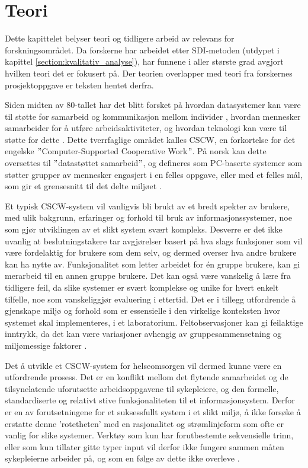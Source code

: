 \chapter{Teori}
\label{chp:teori} 

Dette kapittelet belyser teori og tidligere arbeid av relevans for forskningsområdet. Da forskerne har arbeidet etter SDI-metoden (utdypet i kapittel \ref{section:kvalitativ_analyse}), har funnene i aller største grad avgjort hvilken teori det er fokusert på. Der teorien overlapper med teori fra forskernes prosjektoppgave \citep{Sund13} er teksten hentet derfra. 

\noindent
Siden midten av 80-tallet har det blitt forsket på hvordan datasystemer kan være til støtte for samarbeid og kommunikasjon mellom individer \citep{Rogers94}, hvordan mennesker samarbeider for å utføre arbeidsaktiviteter, og hvordan teknologi kan være til støtte for dette \citep{Ellis91}. Dette tverrfaglige området kalles CSCW, en forkortelse for det engelske $"$Computer-Supported Cooperative Work$"$. På norsk kan dette oversettes til $"$datastøttet samarbeid$"$, og defineres som PC-baserte systemer som støtter grupper av mennesker engasjert i en felles oppgave, eller med et felles mål, som gir et grensesnitt til det delte miljøet \citep{Ellis91}.

\noindent
Et typisk CSCW-system vil vanligvis bli brukt av et bredt spekter av brukere, med ulik bakgrunn, erfaringer og forhold til bruk av informasjonssystemer, noe som gjør utviklingen av et slikt system svært kompleks. Desverre er det ikke uvanlig at beslutningstakere tar avgjørelser basert på hva slags funksjoner som vil være fordelaktig for brukere som dem selv, og dermed overser hva andre brukere kan ha nytte av. Funksjonalitet som letter arbeidet for én gruppe brukere, kan gi merarbeid til en annen gruppe brukere. Det kan også være vanskelig å lære fra tidligere feil, da slike systemer er svært komplekse og unike for hvert enkelt tilfelle, noe som vanskeliggjør evaluering i ettertid. Det er i tillegg utfordrende å gjenskape miljø og forhold som er essensielle i den virkelige konteksten hvor systemet skal implementeres, i et laboratorium. Feltobservasjoner kan gi feilaktige inntrykk, da det kan være variasjoner avhengig av gruppesammensetning og miljømessige faktorer \citep{Berg99}.

\noindent
Det å utvikle et CSCW-system for helseomsorgen vil dermed kunne være en utfordrende prosess. Det er en konflikt mellom det flytende samarbeidet og de tilsynelatende uforutsette arbeidsoppgavene til sykepleiere, og den formelle, standardiserte og relativt stive funksjonaliteten til et informasjonsystem. Derfor er en av forutsetningene for et suksessfullt system i et slikt miljø, å ikke forsøke å erstatte denne 'rotetheten' med en rasjonalitet og strømlinjeform som ofte er vanlig for slike systemer. Verktøy som kun har forutbestemte sekvensielle trinn, eller som kun tillater gitte typer input vil derfor ikke fungere sammen måten sykepleierne arbeider på, og som en følge av dette ikke overleve \citep{Berg99}.